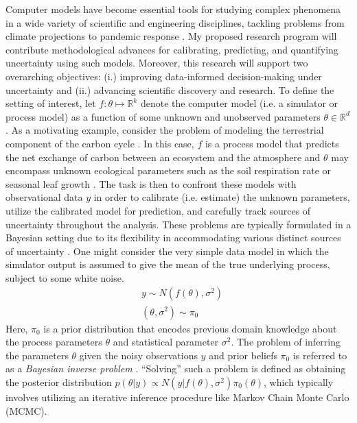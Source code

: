 \documentclass[12pt]{article}
\newcommand{\R}{\mathcal{R}}
\def\R{\mathbb{R}}
\begin{document}
Computer models have become essential tools for studying complex phenomena in a wide variety of scientific and engineering disciplines, 
tackling problems from climate projections \cite{Canadell} to pandemic response \cite{Swallow}. My proposed research program will contribute methodological 
advances for calibrating, predicting, and quantifying uncertainty using such models. Moreover, this research will support two 
overarching objectives: (i.) improving data-informed decision-making under uncertainty and (ii.) advancing scientific discovery and research. To define the 
setting of interest, let $f: \theta \mapsto \R^k$ denote the computer model (i.e. a simulator or process model) as a function of some unknown and unobserved
parameters $\theta \in \R^d$. As a motivating example, consider the problem of modeling the terrestrial component of the carbon cycle \cite{Friedlingstein}. 
In this case, $f$ is a process model that predicts the net exchange of carbon between an ecosystem and the atmosphere \cite{Waring} and $\theta$ may encompass 
unknown ecological parameters such as the soil respiration rate or seasonal leaf growth \cite{Fer}. The task is then to confront these models with observational data $y$ in 
order to calibrate (i.e. estimate) the unknown parameters, utilize the calibrated model for prediction, and carefully track sources of uncertainty throughout the analysis. These problems are typically formulated in a Bayesian setting due to its flexibility in accommodating various distinct sources of uncertainty \cite{Kennedy, Clark}. One might consider the very simple data model in which the simulator output is assumed to give the mean of the true underlying process, subject
to some white noise.   
\begin{align*}
&y \sim N(f(\theta), \sigma^2) \\
&(\theta, \sigma^2) \sim \pi_0
\end{align*}
Here, $\pi_0$ is a prior distribution that encodes previous domain knowledge about the process parameters $\theta$ and statistical parameter $\sigma^2$.
The problem of inferring the parameters $\theta$ given the noisy observations $y$ and prior beliefs $\pi_0$ is referred to as a \textit{Bayesian inverse problem} \cite{Stuart}. ``Solving'' such a problem is defined as obtaining the posterior distribution $p(\theta|y) \propto N(y|f(\theta), \sigma^2)\pi_0(\theta)$, which typically involves utilizing an iterative inference procedure like Markov Chain Monte Carlo (MCMC).
\end{document}
